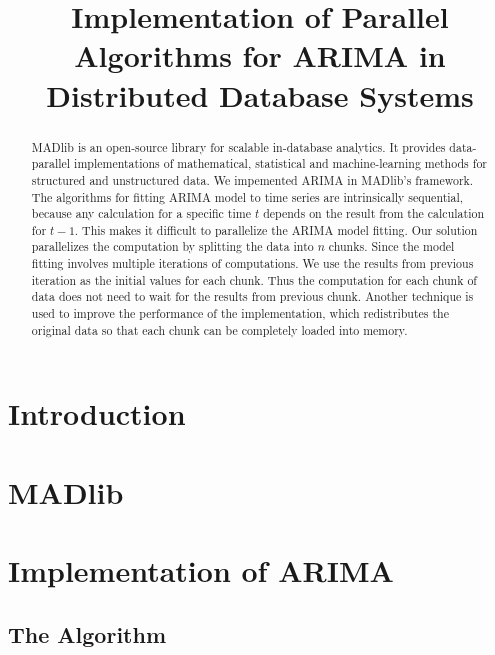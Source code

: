\documentclass[english,12pt]{article}
\begin{document}
\title{Implementation of Parallel Algorithms for ARIMA in Distributed
  Database Systems}


\maketitle

\begin{abstract}
  MADlib is an open-source library for scalable in-database
  analytics. It provides data-parallel implementations of
  mathematical, statistical and machine-learning methods for
  structured and unstructured data. We impemented ARIMA in MADlib's
  framework. The algorithms for fitting ARIMA model to time series are
  intrinsically sequential, because any calculation for a specific
  time $t$ depends on the
  result from the calculation for $t-1$. This makes it difficult to
  parallelize the ARIMA model fitting. Our solution parallelizes the
  computation by splitting the data into $n$ chunks. Since the model
  fitting involves multiple iterations of computations. We use the
  results from previous iteration as the initial values for each
  chunk. Thus the computation for each chunk of data does not need to
  wait for the results from previous chunk. Another technique is used
  to improve the performance of the implementation, which
  redistributes the original data so that each chunk can be completely
  loaded into memory.
\end{abstract}

\section{Introduction}


\section{MADlib}


\section{Implementation of ARIMA}


\subsection{The Algorithm}
\end{document}
